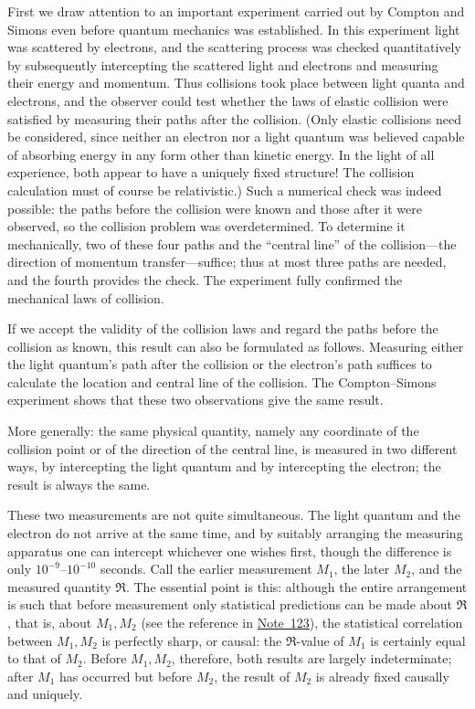 \documentclass[fontsize=13pt,twoside,openany,headings=normal,parskip=false,bookmarkpackage=false,DIV=calc]{scrbook}
\begin{document}
First we draw attention to an important experiment carried out by Compton and Simons even before quantum mechanics was established. In this experiment light was scattered by electrons, and the scattering process was checked quantitatively by subsequently intercepting the scattered light and electrons and measuring their energy and momentum. Thus collisions took place between light quanta and electrons, and the
\hypertarget{origpage-111}{}%
observer could test whether the laws of elastic collision were satisfied by measuring their paths after the collision. (Only elastic collisions need be considered, since neither an electron nor a light quantum was believed capable of absorbing energy in any form other than kinetic energy. In the light of all experience, both appear to have a uniquely fixed structure! The collision calculation must of course be relativistic.) Such a numerical check was indeed possible: the paths before the collision were known and those after it were observed, so the collision problem was overdetermined. To determine it mechanically, two of these four paths and the ``central line'' of the collision---the direction of momentum transfer---suffice; thus at most three paths are needed, and the fourth provides the check. The experiment fully confirmed the mechanical laws of collision.

If we accept the validity of the collision laws and regard the paths before the collision as known, this result can also be formulated as follows. Measuring either the light quantum's path after the collision or the electron's path suffices to calculate the location and central line of the collision. The Compton--Simons experiment shows that these two observations give the same result.

More generally: the same physical quantity, namely any coordinate of the collision point or of the direction of the central line, is measured in two different ways, by intercepting the light quantum and by intercepting the electron; the result is always the same.

These two measurements are not quite simultaneous. The light quantum and the electron do not arrive at the same time, and by suitably arranging the measuring apparatus one can intercept whichever one wishes first, though the difference is only $10^{-9}$--$10^{-10}$ seconds. Call the earlier measurement $M_1$, the later $M_2$, and the measured quantity $\mathfrak R$. The essential point is this: although the entire arrangement is such that before measurement only statistical predictions can be made about $\mathfrak R$, that is, about $M_1,M_2$ (see the reference in \hyperlink{note-123}{Note~123}), the statistical correlation between $M_1,M_2$ is perfectly sharp, or causal: the $\mathfrak R$-value of $M_1$ is certainly equal to that of $M_2$. Before $M_1,M_2$, therefore, both results are largely indeterminate; after $M_1$ has occurred but before $M_2$, the result of $M_2$ is already fixed causally and uniquely.
\end{document}
